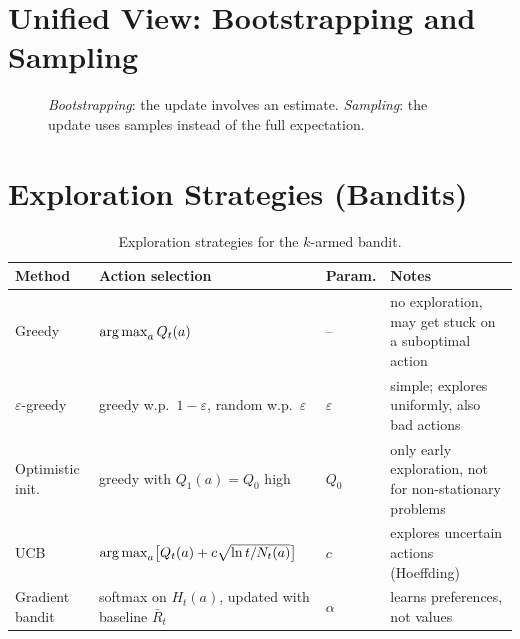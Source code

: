 \section{Unified View: Bootstrapping and Sampling}
\begin{figure}[H]
\centering
{}
\caption{\emph{Bootstrapping}: the update involves an estimate. \emph{Sampling}: the update uses samples instead of the full expectation.}
\label{fig:unified-view}
\end{figure}

\section{Exploration Strategies (Bandits)}
\begin{table}[H]
\centering
\small
\begin{tabularx}{\textwidth}{@{}l >{\raggedright\arraybackslash}X l >{\raggedright\arraybackslash}X@{}}
\toprule
\textbf{Method} & \textbf{Action selection} & \textbf{Param.} & \textbf{Notes} \\
\midrule
Greedy & $\operatorname*{arg\,max}_a Q_t(a)$ & -- & no exploration, may get stuck on a suboptimal action \\
$\varepsilon$-greedy & greedy w.p.\ $1-\varepsilon$, random w.p.\ $\varepsilon$ & $\varepsilon$ & simple; explores uniformly, also bad actions \\
Optimistic init. & greedy with $Q_1(a)=Q_0$ high & $Q_0$ & only early exploration, not for non-stationary problems \\
UCB & $\operatorname*{arg\,max}_a\bigl[Q_t(a)+c\sqrt{\ln t/N_t(a)}\bigr]$ & $c$ & explores uncertain actions (Hoeffding) \\
Gradient bandit & softmax on $H_t(a)$, updated with baseline $\bar R_t$ & $\alpha$ & learns preferences, not values \\
\bottomrule
\end{tabularx}
\caption{Exploration strategies for the $k$-armed bandit.}
\label{tab:bandits-summary}
\end{table}

